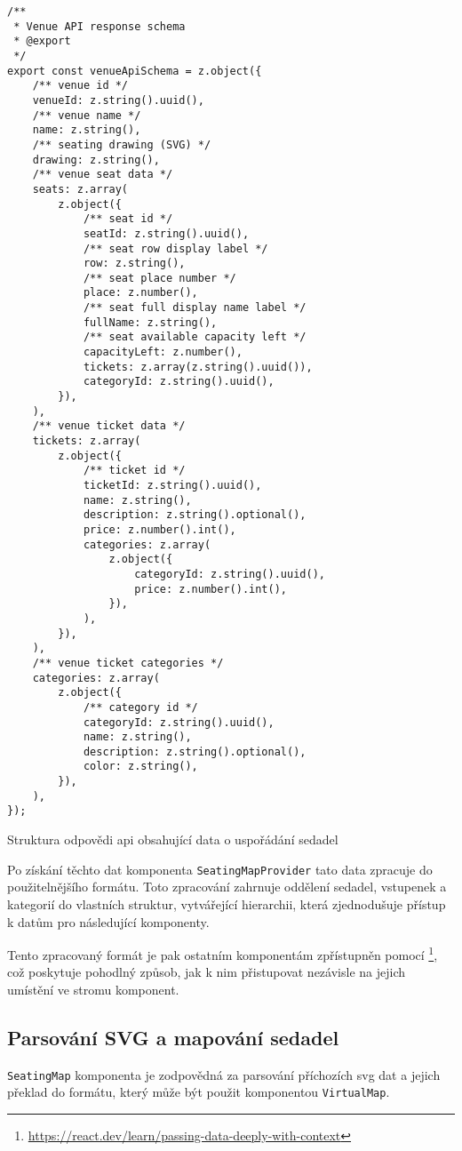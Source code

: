 \begin{listing}[H]
\begin{verbatim}
/**
 * Venue API response schema
 * @export
 */
export const venueApiSchema = z.object({
	/** venue id */
	venueId: z.string().uuid(),
	/** venue name */
	name: z.string(),
	/** seating drawing (SVG) */
	drawing: z.string(),
	/** venue seat data */
	seats: z.array(
		z.object({
			/** seat id */
			seatId: z.string().uuid(),
			/** seat row display label */
			row: z.string(),
			/** seat place number */
			place: z.number(),
			/** seat full display name label */
			fullName: z.string(),
			/** seat available capacity left */
			capacityLeft: z.number(),
			tickets: z.array(z.string().uuid()),
			categoryId: z.string().uuid(),
		}),
	),
	/** venue ticket data */
	tickets: z.array(
		z.object({
			/** ticket id */
			ticketId: z.string().uuid(),
			name: z.string(),
			description: z.string().optional(),
			price: z.number().int(),
			categories: z.array(
				z.object({
					categoryId: z.string().uuid(),
					price: z.number().int(),
				}),
			),
		}),
	),
	/** venue ticket categories */
	categories: z.array(
		z.object({
			/** category id */
			categoryId: z.string().uuid(),
			name: z.string(),
			description: z.string().optional(),
			color: z.string(),
		}),
	),
});
\end{verbatim}
\caption{Struktura odpovědi \ac{api} obsahující data o uspořádání sedadel}
\label{listing:venue-api-schema}
\end{listing}

Po získání těchto dat komponenta \texttt{SeatingMapProvider} tato data zpracuje do použitelnějšího formátu.
Toto zpracování zahrnuje oddělení sedadel, vstupenek a kategorií do vlastních struktur, vytvářející hierarchii, která zjednodušuje přístup k datům pro následující komponenty.

Tento zpracovaný formát je pak ostatním komponentám zpřístupněn pomocí \footnote{\url{https://react.dev/learn/passing-data-deeply-with-context}}, což poskytuje pohodlný způsob, jak k nim přistupovat nezávisle na jejich umístění ve stromu komponent.

\subsection{Parsování SVG a mapování sedadel}
\label{subsec:implementace-seating-svg}
\texttt{SeatingMap} komponenta je zodpovědná za parsování příchozích \ac{svg} dat a jejich překlad do formátu, který může být použit komponentou \texttt{VirtualMap}.

